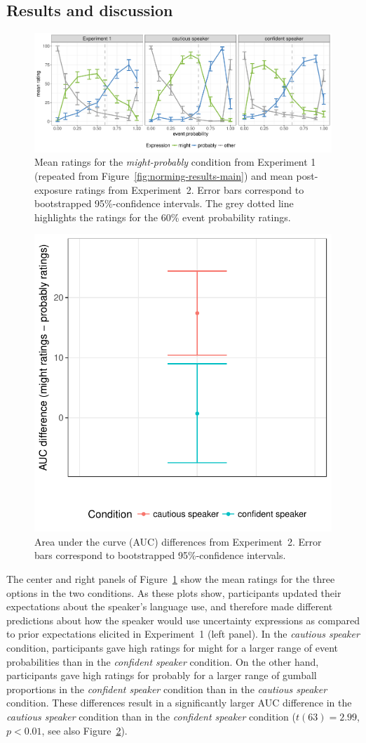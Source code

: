 \documentclass[man, floatsintext]{apa6}
\newcommand{\figref}[1]{Figure~\ref{#1}}
\begin{document}
\subsection{Results and discussion}

\begin{figure}
\includegraphics[width=\textwidth]{plots/exp-1-replication-ratings.pdf}
\caption{Mean ratings for the \textit{might-probably} condition from Experiment 1 (repeated from \figref{fig:norming-results-main}) and mean post-exposure ratings from Experiment~2. Error bars correspond to bootstrapped 95\%-confidence intervals.  The grey dotted line highlights the ratings for the 60\% event probability ratings.  \label{fig:adaptation-results-prod}}
\end{figure}

\begin{figure}
\center
\includegraphics[width=.4\textwidth]{plots/exp-1-auc.pdf}
\caption{Area under the curve (AUC) differences from Experiment~2. Error bars correspond to bootstrapped 95\%-confidence intervals.  \label{fig:adaptation-auc-prod}}
\end{figure}

The center and right panels of Figure~\ref{fig:adaptation-results-prod} show the mean ratings for the three options in the two conditions. As these plots show, participants updated their expectations about the speaker's language use, and therefore made different predictions about how the speaker would use uncertainty expressions as compared to prior expectations elicited in Experiment~1 (left panel). In the \emph{cautious speaker} condition, participants gave high ratings for {\sc might} for a larger range of event probabilities than in the \emph{confident speaker} condition. On the other hand, participants gave high ratings for {\sc probably} for a larger range of gumball proportions in the \emph{confident speaker} condition than in the \emph{cautious speaker} condition. These differences result in a significantly larger AUC difference in the \emph{cautious speaker} condition than in the \emph{confident speaker} condition ($t(63) = 2.99$, $p < 0.01$, see also Figure~\ref{fig:adaptation-auc-prod}).
\end{document}
